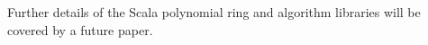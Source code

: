 \documentclass{llncs}
\newcommand{\code}[1]{\texttt{#1}}
\begin{document}
Further details of the Scala polynomial ring and algorithm libraries
will be covered by a future paper.


%
%
%
%
%
%
%
%
\end{document}

